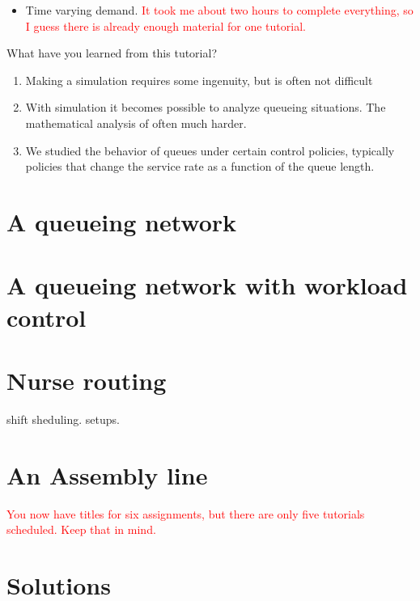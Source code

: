 \documentclass{scrartcl}
\newcommand{\notet}[1]{\textcolor{red}{#1}}
\begin{document}
\begin{itemize}
\item Time varying demand. \notet{It took me about two hours to complete everything, so I guess there is already enough material for one tutorial.}
\end{itemize}


\begin{exercise}
  What have you learned from this tutorial?
  \begin{solution}
    \begin{enumerate}
    \item  Making a  simulation requires some ingenuity, but is often not difficult
    \item With simulation it becomes possible to analyze queueing situations. The mathematical analysis of often much harder. 
    \item We studied the behavior of queues under certain control policies, typically policies that change the service rate as a function of the queue length.
    \end{enumerate}
  \end{solution}
\end{exercise}

\clearpage

\section{A queueing network}
\label{sec:queueing-network}


\section{A queueing network with workload control}
\label{sec:queu-netw-with}




\section{Nurse routing}
\label{sec:nurse-routing}

shift sheduling. setups. 


\section{An Assembly line}
\label{sec:an-assembly-line}
\notet{You now have titles for six assignments, but there are only five tutorials scheduled. Keep that in mind.}





\clearpage
\section*{Solutions}

\end{document}
